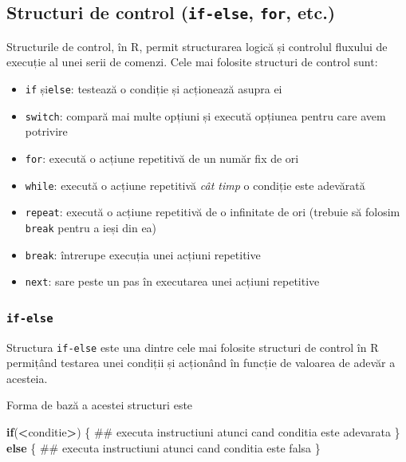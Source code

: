 \documentclass[]{article}
\newenvironment{Shaded}{\begin{snugshade}}{\end{snugshade}}
\newcommand{\ControlFlowTok}[1]{\textcolor[rgb]{0.13,0.29,0.53}{\textbf{#1}}}
\newcommand{\OperatorTok}[1]{\textcolor[rgb]{0.81,0.36,0.00}{\textbf{#1}}}
\newcommand{\NormalTok}[1]{#1}
\newcounter{exo}[section]
\begin{document}
\subsection{\texorpdfstring{Structuri de control (\texttt{if-else},
\texttt{for},
etc.)}{Structuri de control (if-else, for, etc.)}}\label{structuri-de-control-if-else-for-etc.}

Structurile de control, în R, permit structurarea logică și controlul
fluxului de execuție al unei serii de comenzi. Cele mai folosite
structuri de control sunt:

\begin{itemize}
\item
  \texttt{if} și\texttt{else}: testează o condiție și acționează asupra
  ei
\item
  \texttt{switch}: compară mai multe opțiuni și execută opțiunea pentru
  care avem potrivire
\item
  \texttt{for}: execută o acțiune repetitivă de un număr fix de ori
\item
  \texttt{while}: execută o acțiune repetitivă \emph{cât timp} o
  condiție este adevărată
\item
  \texttt{repeat}: execută o acțiune repetitivă de o infinitate de ori
  (trebuie să folosim \texttt{break} pentru a ieși din ea)
\item
  \texttt{break}: întrerupe execuția unei acțiuni repetitive
\item
  \texttt{next}: sare peste un pas în executarea unei acțiuni repetitive
\end{itemize}

\subsubsection{\texorpdfstring{\texttt{if-else}}{if-else}}\label{if-else}

Structura \texttt{if-else} este una dintre cele mai folosite structuri
de control în R permițând testarea unei condiții și acționând în funcție
de valoarea de adevăr a acesteia.

Forma de bază a acestei structuri este

\begin{Shaded}
\begin{Highlighting}[]
\ControlFlowTok{if}\NormalTok{(}\OperatorTok{<}\NormalTok{conditie}\OperatorTok{>}\NormalTok{) \{}
\NormalTok{        ## executa instructiuni atunci cand conditia este adevarata}
\NormalTok{\} }
\ControlFlowTok{else}\NormalTok{ \{}
\NormalTok{        ## executa instructiuni atunci cand conditia este falsa}
\NormalTok{\}}
\end{Highlighting}
\end{Shaded}
\end{document}
